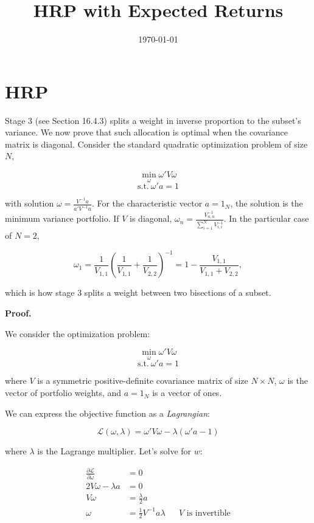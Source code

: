 \documentclass[12pt]{article}
\title{HRP with Expected Returns}
\date{\today}
\begin{document}
\maketitle

\section*{HRP}

Stage 3 (see Section 16.4.3) splits a weight in inverse proportion to the subset’s variance. We now prove that such allocation is optimal when the covariance matrix is diagonal. Consider the standard quadratic optimization problem of size $N$,

\[
\min_{\omega} \omega' V \omega
\]
\[
\text{s.t.} \ \omega' a = 1
\]

with solution $\omega = \frac{V^{-1} a}{a' V^{-1} a}$. For the characteristic vector $a = 1_N$, the solution is the minimum variance portfolio. If $V$ is diagonal, $\omega_n = \frac{V^{-1}_{n,n}}{\sum_{i=1}^{N} V^{-1}_{i,i}}$. In the particular case of $N = 2$,

\[
\omega_1 = \frac{1}{V_{1,1}} \left( \frac{1}{V_{1,1}} + \frac{1}{V_{2,2}} \right)^{-1} = 1 - \frac{V_{1,1}}{V_{1,1} + V_{2,2}},
\]

which is how stage 3 splits a weight between two bisections of a subset.

\textbf{Proof.}

We consider the optimization problem:

\[
\min_{\omega} \omega' V \omega
\]
\[
\text{s.t.} \ \omega' a = 1
\]

where \( V \) is a symmetric positive-definite covariance matrix of size \( N \times N \), \( \omega \) is the vector of portfolio weights, and \( a = 1_N \) is a vector of ones.

We can express the objective function as a \textit{Lagrangian}:

$$
\mathcal{L}(\omega, \lambda) = \omega' V \omega - \lambda (\omega' a - 1)
$$

where \( \lambda \) is the Lagrange multiplier. Let's solve for $w$:


\begin{align*}
\frac{\partial \mathcal{L}}{\partial \omega} 
&= 0\\
2V \omega - \lambda a &= 0\\
V \omega &= \frac{\lambda}{2} a\\
\omega &= \frac{1}{2} V^{-1} a \lambda && V \text{ is invertible}
\end{align*}
\end{document}
